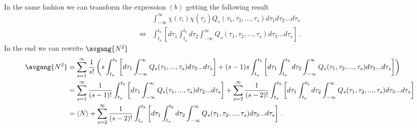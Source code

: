 In the same fashion we can transform the expression $(b)$ getting the following result
\begin{align*}
  & \int_{-\infty}^{\infty}\chi(\tau_i)\chi(\tau_j)Q_s(\tau_1,\tau_2,...,\tau_s)d\tau_1d\tau_2...d\tau_s \\
  \Leftrightarrow
  & \int_{t_a}^{t_b}\left[d\tau_1\int_{t_a}^{t_b}d\tau_2\int_{-\infty}^{\infty}Q_s(\tau_1,\tau_2,...,\tau_s)d\tau_3...d\tau_s\right]
  \, .
\end{align*}
In the end we can rewrite $\avgang{N^2}$
\begin{align*}
  \avgang{N^2}
  &= \sum_{s=1}^{\infty}\frac{1}{s!} \left( s\int_{t_a}^{t_b}\left[d\tau_1 \int_{-\infty}^{\infty}Q_s(\tau_1,...,\tau_s)d\tau_2...d\tau_s\right] + (s-1)s \int_{t_a}^{t_b} \left[d\tau_1\int_{t_a}^{t_b}d\tau_2\int_{-\infty}^{\infty}Q_s(\tau_1,\tau_2,...,\tau_s)d\tau_3...d\tau_s\right] \right) \\
  &= \sum_{s=1}^\infty \frac{1}{(s-1)!} \int_{t_a}^{t_b} \left[d\tau_1 \int_{-\infty}^\infty Q_s(\tau_1,...,\tau_s)d\tau_2...d\tau_s\right] + \sum_{s=2}^{\infty}\frac{1}{(s-2)!}\int_{t_a}^{t_b}\left[d\tau_1\int_{t_a}^{t_b}d\tau_2\int_{-\infty}^{\infty}Q_s(\tau_1,\tau_2,...,\tau_s)d\tau_3...d\tau_s\right] \\
  &= \langle N \rangle+\sum_{s=2}^{\infty}\frac{1}{(s-2)!}\int_{t_a}^{t_b}\left[d\tau_1\int_{t_a}^{t_b}d\tau_2\int_{-\infty}^{\infty}Q_s(\tau_1,\tau_2,...,\tau_s)d\tau_3...d\tau_s\right]
  \, .
\end{align*}
